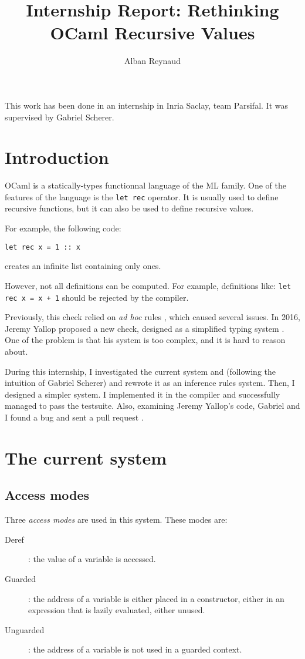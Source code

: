 \documentclass{article}
\title{Internship Report: Rethinking OCaml Recursive Values}
\author{Alban Reynaud}
\date{}
\begin{document}
\maketitle

This work has been done in an internship in Inria Saclay, team Parsifal. It was
supervised by Gabriel Scherer.


\section{Introduction}
OCaml is a statically-types functionnal language of the ML family. One of the
features of the language is the \lstinline|let rec| operator. It is usually
used to define recursive functions, but it can also be used to define recursive
values.

For example, the following code:
\begin{lstlisting}
let rec x = 1 :: x
\end{lstlisting}
creates an infinite list containing only ones.

However, not all definitions can be computed. For example, definitions like:
\lstinline|let rec x = x + 1| should be rejected by the compiler.

Previously, this check relied on \textit{ad hoc} rules \cite{PreviousRules},
which caused several issues. In 2016, Jeremy Yallop proposed a new check,
designed as a simplified typing system \cite{Yallop}. One of the problem is that
his system is too complex, and it is hard to reason about.

During this internship, I investigated the current system and (following the
intuition of Gabriel Scherer) and rewrote it as an inference rules system. Then,
I designed a simpler system. I implemented it in the compiler and successfully
managed to pass the testsuite. Also, examining Jeremy Yallop's code, Gabriel and
I found a bug and sent a pull request
.

\section{The current system}

\subsection{Access modes}
Three \textit{access modes} are used in this system. These modes are:
\begin{description}
  \item[Deref] : the value of a variable is accessed.
  \item[Guarded] : the address of a variable is either placed in a constructor,
    either in an expression that is lazily evaluated, either unused.
  \item[Unguarded] : the address of a variable is not used in a guarded
    context.
\end{description}
\end{document}
